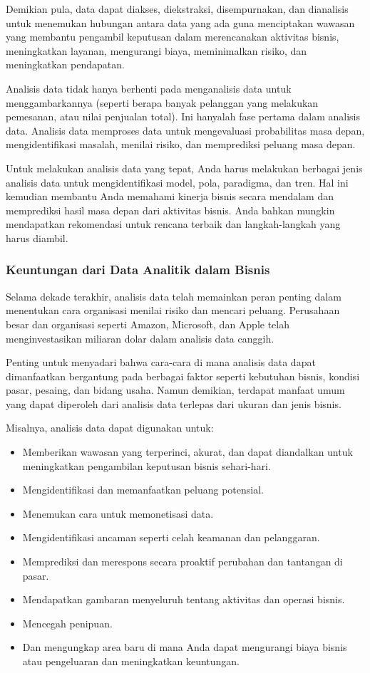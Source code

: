 \documentclass{article}
\begin{document}
Demikian pula, data dapat diakses, diekstraksi, disempurnakan, dan dianalisis untuk menemukan hubungan antara data yang ada guna menciptakan wawasan yang membantu pengambil keputusan dalam merencanakan aktivitas bisnis, meningkatkan layanan, mengurangi biaya, meminimalkan risiko, dan meningkatkan pendapatan.

Analisis data tidak hanya berhenti pada menganalisis data untuk menggambarkannya (seperti berapa banyak pelanggan yang melakukan pemesanan, atau nilai penjualan total). Ini hanyalah fase pertama dalam analisis data. Analisis data memproses data untuk mengevaluasi probabilitas masa depan, mengidentifikasi masalah, menilai risiko, dan memprediksi peluang masa depan.

Untuk melakukan analisis data yang tepat, Anda harus melakukan berbagai jenis analisis data untuk mengidentifikasi model, pola, paradigma, dan tren. Hal ini kemudian membantu Anda memahami kinerja bisnis secara mendalam dan memprediksi hasil masa depan dari aktivitas bisnis. Anda bahkan mungkin mendapatkan rekomendasi untuk rencana terbaik dan langkah-langkah yang harus diambil.

\subsubsection{Keuntungan dari Data Analitik dalam Bisnis}

Selama dekade terakhir, analisis data telah memainkan peran penting dalam menentukan cara organisasi menilai risiko dan mencari peluang. Perusahaan besar dan organisasi seperti Amazon, Microsoft, dan Apple telah menginvestasikan miliaran dolar dalam analisis data canggih.

Penting untuk menyadari bahwa cara-cara di mana analisis data dapat dimanfaatkan bergantung pada berbagai faktor seperti kebutuhan bisnis, kondisi pasar, pesaing, dan bidang usaha. Namun demikian, terdapat manfaat umum yang dapat diperoleh dari analisis data terlepas dari ukuran dan jenis bisnis.

Misalnya, analisis data dapat digunakan untuk:
\begin{itemize}
    \item Memberikan wawasan yang terperinci, akurat, dan dapat diandalkan untuk meningkatkan pengambilan keputusan bisnis sehari-hari.
    \item Mengidentifikasi dan memanfaatkan peluang potensial.
    \item Menemukan cara untuk memonetisasi data.
    \item Mengidentifikasi ancaman seperti celah keamanan dan pelanggaran.
    \item Memprediksi dan merespons secara proaktif perubahan dan tantangan di pasar.
    \item Mendapatkan gambaran menyeluruh tentang aktivitas dan operasi bisnis.
    \item Mencegah penipuan.
    \item Dan mengungkap area baru di mana Anda dapat mengurangi biaya bisnis atau pengeluaran dan meningkatkan keuntungan.
\end{itemize}
\end{document}
